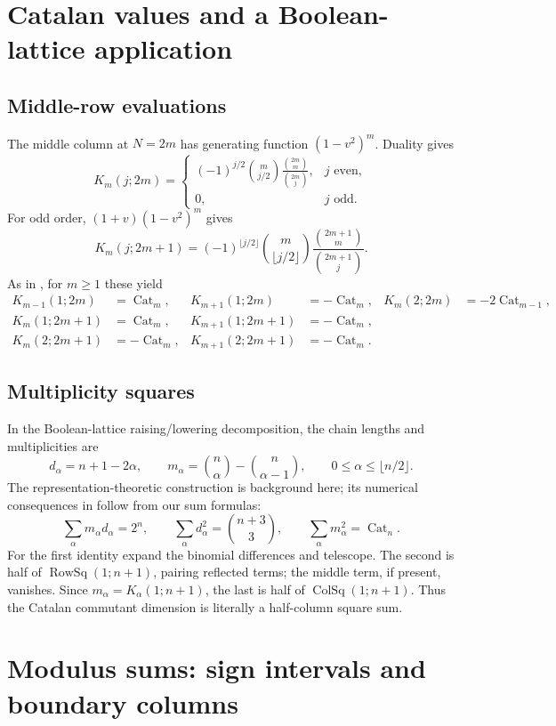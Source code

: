 \documentclass[11pt,reqno]{amsart}
\theoremstyle{remark}\newtheorem{remark}[theorem]{Remark}
\newcommand{\Cat}{\operatorname{Cat}}
\DeclareMathOperator{\RowSq}{RowSq}
\DeclareMathOperator{\ColSq}{ColSq}
\begin{document}
\section{Catalan values and a Boolean-lattice application}
\subsection{Middle-row evaluations}
The middle column at $N=2m$ has generating function $(1-v^2)^m$. Duality gives
\begin{equation}\label{middlerow}
K_m(j;2m)=\begin{cases}
(-1)^{j/2}\binom m{j/2}\displaystyle\frac{\binom{2m}{m}}{\binom{2m}{j}},&j\text{ even},\\0,&j\text{ odd}.
\end{cases}
\end{equation}
For odd order, $(1+v)(1-v^2)^m$ gives
\[
K_m(j;2m+1)=(-1)^{\lfloor j/2\rfloor}\binom m{\lfloor j/2\rfloor}
\frac{\binom{2m+1}{m}}{\binom{2m+1}{j}}.
\]
As in \cite{Feinsilver2016}, for $m\ge1$ these yield
\begin{align*}
K_{m-1}(1;2m)&=\Cat_m,&K_{m+1}(1;2m)&=-\Cat_m,&K_m(2;2m)&=-2\Cat_{m-1},\\
K_m(1;2m+1)&=\Cat_m,&K_{m+1}(1;2m+1)&=-\Cat_m,\\
K_m(2;2m+1)&=-\Cat_m,&K_{m+1}(2;2m+1)&=-\Cat_m.
\end{align*}

\subsection{Multiplicity squares}
In the Boolean-lattice raising/lowering decomposition, the chain lengths and multiplicities are
\[
d_\alpha=n+1-2\alpha,\qquad
m_\alpha=\binom n\alpha-\binom n{\alpha-1},\qquad
0\le\alpha\le\lfloor n/2\rfloor.
\]
The representation-theoretic construction is background here; its numerical consequences in \cite{Feinsilver2016} follow from our sum formulas:
\[
\sum_\alpha m_\alpha d_\alpha=2^n,\qquad
\sum_\alpha d_\alpha^2=\binom{n+3}{3},\qquad
\sum_\alpha m_\alpha^2=\Cat_n.
\]
For the first identity expand the binomial differences and telescope. The second is half of $\RowSq(1;n+1)$, pairing reflected terms; the middle term, if present, vanishes. Since $m_\alpha=K_\alpha(1;n+1)$, the last is half of $\ColSq(1;n+1)$. Thus the Catalan commutant dimension is literally a half-column square sum.

\section{Modulus sums: sign intervals and boundary columns}
\end{document}

